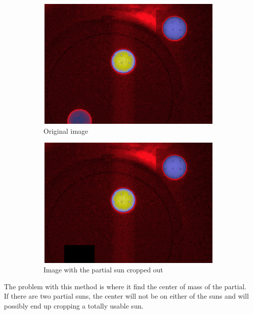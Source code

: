 \documentclass[10pt]{scrartcl}
\begin{document}
\begin{figure}[!ht]
    \centering
   \begin{subfigure}[b]{.49\textwidth}
        \centering
        \includegraphics[width=1.\textwidth]{../plots_tables_images/inputimage.eps}
        \caption{Original image}
        \label{og_image}
    \end{subfigure}
    \begin{subfigure}[b]{.49\textwidth}
        \centering
        \includegraphics[width=1.\textwidth]{../plots_tables_images/fixedimage.eps}
        \caption{Image with the partial sun cropped out}
        \label{fixed_image}
    \end{subfigure}
    \caption{}
    \label{fixtheregion}
\end{figure}

The problem with this method is where it find the center of mass of the partial. If there are two partial suns, the center will not be on either of the suns and will possibly end up cropping a totally usable sun.
\end{document}
